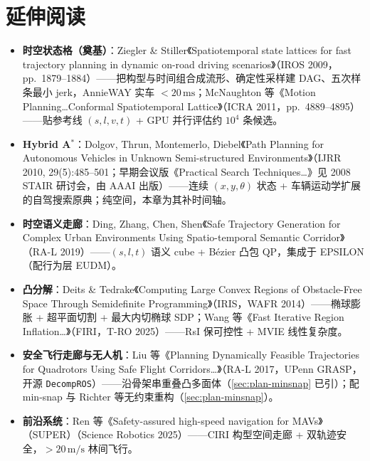 \section*{延伸阅读}
\begin{itemize}
  \item \textbf{时空状态格（奠基）}：Ziegler \& Stiller《Spatiotemporal state lattices for fast trajectory planning in dynamic on-road driving scenarios》\cite{ziegler2009spatiotemporal}（IROS 2009，pp.\ 1879--1884）——把构型与时间组合成流形、确定性采样建 DAG、五次样条最小 jerk，AnnieWAY 实车 $<20\,\mathrm{ms}$；McNaughton 等《Motion Planning\dots Conformal Spatiotemporal Lattice》\cite{mcnaughton2011lattice}（ICRA 2011，pp.\ 4889--4895）——贴参考线 $(s,l,v,t)$ + GPU 并行评估约 $10^4$ 条候选。
  \item \textbf{Hybrid A$^*$}：Dolgov, Thrun, Montemerlo, Diebel《Path Planning for Autonomous Vehicles in Unknown Semi-structured Environments》\cite{dolgov2010hybrid}（IJRR 2010, 29(5):485--501；早期会议版《Practical Search Techniques\dots》见 2008 STAIR 研讨会，由 AAAI 出版）——连续 $(x,y,\theta)$ 状态 + 车辆运动学扩展的自驾搜索原典；纯空间，本章为其补时间轴。
  \item \textbf{时空语义走廊}：Ding, Zhang, Chen, Shen《Safe Trajectory Generation for Complex Urban Environments Using Spatio-temporal Semantic Corridor》\cite{ding2019ssc}（RA-L 2019）——$(s,l,t)$ 语义 cube + Bézier 凸包 QP，集成于 EPSILON（配行为层 EUDM）。
  \item \textbf{凸分解}：Deits \& Tedrake《Computing Large Convex Regions of Obstacle-Free Space Through Semidefinite Programming》\cite{deits2015iris}（IRIS，WAFR 2014）——椭球膨胀 + 超平面切割 + 最大内切椭球 SDP；Wang 等《Fast Iterative Region Inflation\dots》\cite{wang2025firi}（FIRI，T-RO 2025）——RsI 保可控性 + MVIE 线性复杂度。
  \item \textbf{安全飞行走廊与无人机}：Liu 等《Planning Dynamically Feasible Trajectories for Quadrotors Using Safe Flight Corridors\dots》\cite{liu2017corridor}（RA-L 2017，UPenn GRASP，开源 \texttt{DecompROS}）——沿骨架串重叠凸多面体（\cref{sec:plan-minsnap} 已引）；配 min-snap\cite{mellinger2011minimum} 与 Richter 等无约束重构\cite{richter2016polynomial}（\cref{sec:plan-minsnap}）。
  \item \textbf{前沿系统}：Ren 等《Safety-assured high-speed navigation for MAVs》（SUPER）\cite{ren2025super}（Science Robotics 2025）——CIRI 构型空间走廊 + 双轨迹安全，$>20\,\mathrm{m/s}$ 林间飞行。

\end{itemize}
